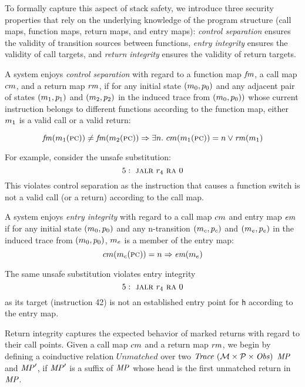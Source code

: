\documentclass[acmsmall,review,anonymous]{acmart}\settopmatter{printfolios=true,printccs=false,printacmref=false}
\begin{document}
To formally capture this aspect of stack safety, we introduce three
security properties that rely on the underlying knowledge of the
program structure (call maps, function maps, return maps, and entry
maps): {\em control separation} ensures the validity of transition
sources between functions, {\em entry integrity} ensures the validity
of call targets, and {\em return integrity} ensures the validity of
return targets.


A system enjoys {\em control separation} with regard to a function map
\(\mathit{fm}\), a call map \(cm\), and a return map \(\mathit{rm}\),
if for any initial state \((m_0, p_0)\) and any adjacent pair
of states \((m_1,p_1)\) and \((m_2,p_2)\) in the induced
trace from \((m_0,p_0))\) whose current instruction
belongs to different functions according to the function map,
either $m_1$ is a valid call or a valid return:

\[ \mathit{fm}(m_1(\textsc{pc})) \not = \mathit{fm}(m_2(\textsc{pc})) \Rightarrow
\exists n. ~ cm(m_1(\textsc{pc})) = n \vee
\mathit{rm}(m_1) \]

For example, consider the unsafe substitution:
\[
5 : ~ \textsc{jalr} ~ r_4 ~ \textsc{ra} ~ 0
\]
This violates control separation as the instruction that causes a
function switch is not a valid call (or a return) according to the
call map.


A system enjoys {\em entry integrity} with regard to a call map
\(cm\) and entry map \(\mathit{em}\) if for any initial state
\((m_0, p_0)\) and any n-transition \((m_c,p_c)\) and
\((m_e, p_e)\) in the induced trace from
\((m_0,p_0)\), $m_e$ is a member of the entry map:
\[cm(m_c(\textsc{pc})) = n \Rightarrow \mathit{em}(m_e)\]

The same unsafe substitution violates entry integrity
\[
5 : ~ \textsc{jalr} ~ r_4 ~ \textsc{ra} ~ 0
\]
as its target (instruction 42) is not an established entry point for
{\tt h} according to the entry map.



\newcommand*{\Unmatched}{\mathit{Unmatched}}

Return integrity captures the expected behavior of marked returns with
regard to their call points. Given a call map $cm$ and a return
map $\mathit{rm}$, we begin by defining a coinductive relation
$\Unmatched$ over two $\mathit{Trace}~({\mathcal M} \times \mathcal{P} \times \mathit{Obs})$ $\mathit{MP}$ and $\mathit{MP}'$, if $\mathit{MP}'$ is a
suffix of $\mathit{MP}$ whose head is the first unmatched return in $\mathit{MP}$.
\end{document}
